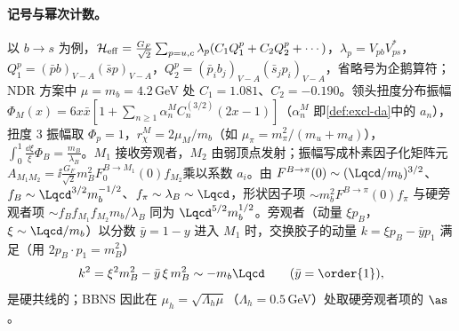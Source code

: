 \paragraph{记号与幂次计数。}
以 $b\to s$ 为例，$\mathcal H_{\rm eff}=\frac{G_F}{\sqrt2}\sum_{p=u,c}\lambda_p(C_1Q_1^p+C_2Q_2^p+\cdots)$，$\lambda_p=V_{pb}V_{ps}^*$，$Q_1^p=(\bar pb)_{V-A}(\bar sp)_{V-A}$，$Q_2^p=(\bar p_ib_j)_{V-A}(\bar s_jp_i)_{V-A}$，省略号为企鹅算符；NDR 方案中 $\mu=m_b=4.2$\,GeV 处 $C_1=1.081$、$C_2=-0.190$\cite[表~1]{BenekeEtAl2001}。领头扭度分布振幅 $\Phi_M(x)=6x\bar x[1+\sum_{n\ge1}\alpha_n^MC_n^{(3/2)}(2x-1)]$（$\alpha_n^M$ 即\cref{def:excl-da}中的 $a_n$），扭度 3 振幅取 $\Phi_p=1$，$r_\chi^M=2\mu_M/m_b$（如 $\mu_\pi=m_\pi^2/(m_u+m_d)$），$\int_0^1\frac{\dd\xi}{\xi}\Phi_B=\frac{m_B}{\lambda_B}$。$M_1$ 接收旁观者，$M_2$ 由弱顶点发射；振幅写成朴素因子化矩阵元 $A_{M_1M_2}=\ii\frac{G_F}{\sqrt2}m_B^2F_0^{B\to M_1}(0)f_{M_2}$\cite[式~(11)]{BenekeNeubert2003}乘以系数 $a_i$。由 $F^{B\to\pi}(0)\sim(\Lqcd/m_b)^{3/2}$、$f_B\sim\Lqcd^{3/2}m_b^{-1/2}$、$f_\pi\sim\lambda_B\sim\Lqcd$，形状因子项 $\sim m_b^2F^{B\to\pi}(0)f_\pi$ 与硬旁观者项 $\sim f_Bf_{M_1}f_{M_2}m_b/\lambda_B$ 同为 $\Lqcd^{5/2}m_b^{1/2}$。旁观者（动量 $\xi p_B$，$\xi\sim\Lqcd/m_b$）以分数 $\bar y=1-y$ 进入 $M_1$ 时，交换胶子的动量 $k=\xi p_B-\bar yp_1$ 满足（用 $2p_B\cdot p_1=m_B^2$）
\begin{equation}\label{eq:heavy-hc-gluon}
k^2=\xi^2m_B^2-\bar y\,\xi\,m_B^2\sim-m_b\Lqcd\qquad(\bar y=\order{1}),
\end{equation}
是硬共线的；BBNS 因此在 $\mu_h=\sqrt{\Lambda_h\mu}$（$\Lambda_h=0.5$\,GeV）处取硬旁观者项的 $\as$\cite{BenekeEtAl2001}。

